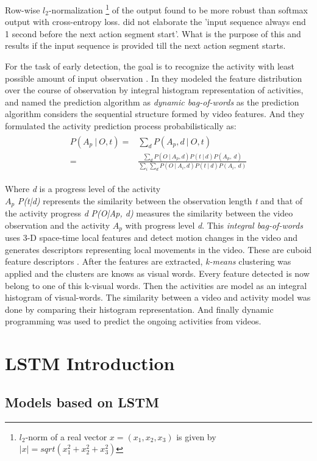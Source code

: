 \newpara Row-wise $\textit{l}_2$-normalization \footnote{$l_2$-norm of a real vector $x=(x_1,x_2,x_3)$ is given by $|x|=sqrt(x_1^2+x_2^2+x_3^2)$} of the output found to be more robust than softmax output with cross-entropy loss. \cite{abu2018will} did not elaborate the 'input sequence always end 1 second before the next action segment start'. What is the purpose of this and results if the input sequence is provided till the next action segment starts.

\newpara For the task of early detection, the goal is to recognize the activity with least possible amount of input observation \cite{ryoo2011human}. In \cite{ryoo2011human} they modeled the feature distribution over the course of observation by integral histogram representation of activities, and named the prediction algorithm as \textit{dynamic bag-of-words} as the prediction algorithm considers the sequential structure formed by video features. And they formulated the activity prediction process probabilistically as:
\begin{align}
\begin{split}
		P(A_{p}\: |\: O,t) ={}& \displaystyle \sum_{d}  P(A_{p},d\: |\: O,t)\\
		={}&	\frac{\sum_{d} P(O\: | \: A_{p},d)P(t\: | \:d)P(A_{p},\: d)}
	 {\sum_{i}\sum_{d} P(O\: | \: A_{i},d)P(t\: | \:d)P(A_{i},\: d) }
\end{split}
\end{align}

\newpara Where \textit{d} is a progress level of the activity \\
\textit{$A_{p}$}  \textit{ P(t|d)} represents the similarity between the observation length \textit{t} and that of the activity progress \textit{d}
\textit{P(O|Ap, d)} measures the similarity between the video observation and the activity \textit{$A_{p}$} with progress level \textit{d}. This \textit{integral bag-of-words} uses 3-D space-time local features and detect motion changes in the video and generates descriptors representing local movements in the video. These are cuboid feature descriptors \cite{dollar2005behavior}. After the features are extracted, \textit{k-means} clustering was applied and the clusters are knows as visual words. Every feature detected is now belong to one of this k-visual words. Then the activities are model as an integral histogram of visual-words. The similarity between a video and activity model was done by comparing their histogram representation. And finally dynamic programming was used to predict the ongoing activities from videos.

\section{LSTM Introduction}
\subsection{Models based on LSTM }




